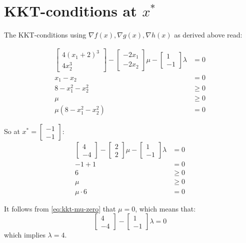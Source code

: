 \documentclass[oneside, a4paper]{book}
\newcommand\br[1]{\left(#1\right)}
\begin{document}
\section{KKT-conditions at $x^*$}

The KKT-conditions using $\nabla f(x), \nabla g(x), \nabla h(x)$ as derived above read:

\begin{align}
    \begin{bmatrix}
        4(x_1+2)^3\\
        4x_2^3
    \end{bmatrix} - \begin{bmatrix}-2x_1\\-2x_2\end{bmatrix} \mu - \begin{bmatrix}1\\-1\end{bmatrix}\lambda &= 0\\
    x_1 - x_2 &= 0\\
    8 - x_1^2 - x_2^2 &\geq 0\\
    \mu &\geq 0\\
    \mu \br{8 - x_1^2 - x_2^2} &= 0
\end{align}

So at $x^* = \begin{bmatrix}-1\\-1\end{bmatrix}$:
\begin{align}
    \begin{bmatrix}4\\-4\end{bmatrix} 
    - \begin{bmatrix}2\\2\end{bmatrix} \mu 
    - \begin{bmatrix}1\\-1\end{bmatrix}\lambda &= 0\\
    -1 +1 &= 0\\
    6 &\geq 0\\
    \mu &\geq 0\\
    \mu \cdot 6 &= 0 \label{eq:kkt-mu-zero}
\end{align}

It follows from \autoref{eq:kkt-mu-zero} that $\mu=0$, which means that:
\begin{equation}
    \begin{bmatrix}4\\-4\end{bmatrix} 
    -\begin{bmatrix}1\\-1\end{bmatrix}\lambda = 0
\end{equation}
which implies $\lambda = 4$. 
\end{document}
